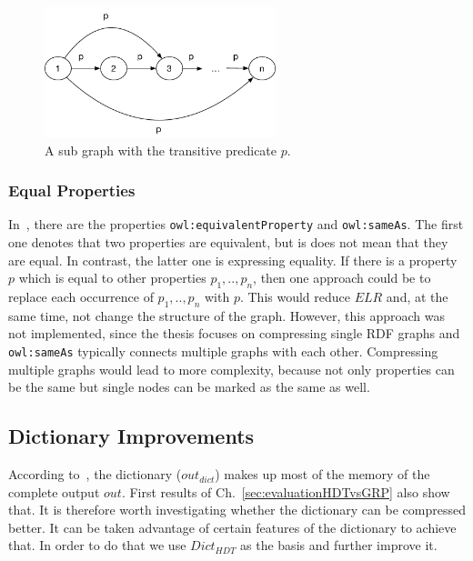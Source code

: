 \begin{figure}[h]
	\centering
	\includegraphics[width=0.6\textwidth]{figures/approach/transitiveMat}
	\caption{A sub graph with the transitive predicate $p$.}
	\label{fig:transitiveMat}
\end{figure}


\subsubsection{Equal Properties}\label{sec:approachEqualProperties}

In~\cite{owl}, there are the properties {\tt owl:equivalentProperty} and {\tt owl:sameAs}. The first one denotes that two properties are equivalent, but is does not mean that they are equal. In contrast, the latter one is expressing equality. If there is a property $p$ which is equal to other properties $p_1,..,p_n$, then one approach could be to replace each occurrence of $p_1,..,p_n$ with $p$. This would reduce $ELR$ and, at the same time, not change the structure of the graph. However, this approach was not implemented, since the thesis focuses on compressing single RDF graphs and {\tt owl:sameAs} typically connects multiple graphs with each other. Compressing multiple graphs would lead to more complexity, because not only properties can be the same but single nodes can be marked as the same as well.


\subsection{Dictionary Improvements}\label{sec:approachDictImprovements}


According to~\cite{hdt}, the dictionary ($out_{dict}$) makes up most of the memory of the complete output $out$. First results of Ch.~\ref{sec:evaluationHDTvsGRP} also show that. It is therefore worth investigating whether the dictionary can be compressed better. It can be taken advantage of certain features of the dictionary to achieve that. In order to do that we use $Dict_{HDT}$ as the basis and further improve it.


